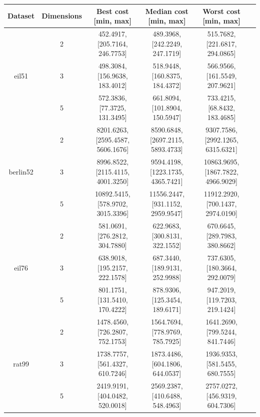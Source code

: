 \documentclass[conference]{IEEEtran}
\begin{document}
\begin{table}[h]
    \centering
    \begin{tabular}{|c|c|c|c|c|c|}
        \hline 
        Dataset & Dimensions & Best cost [min, max] & Median cost [min, max] & Worst cost [min, max] \\
        \hline
        & 2 & 452.4917, [205.7164, 246.7753] & 489.3968, [242.2249, 247.1719] & 515.7682, [221.6817, 294.0865] \\
        eil51 & 3 & 498.3084, [156.9638, 183.4012] & 518.9448, [160.8375, 184.4372] & 566.9566, [161.5549, 207.9621] \\
        & 5 & 572.3836, [77.3725, 131.3495] & 661.8094, [101.8904, 150.5947] & 733.4215, [68.8432, 183.4685] \\
        \hline
        & 2 & 8201.6263, [2595.4587, 5606.1676] & 8590.6848, [2697.2115, 5893.4733] & 9307.7586, [2992.1265, 6315.6321] \\
        berlin52 & 3 & 8996.8522, [2115.4115, 4001.3250] & 9594.4198, [1223.1735, 4365.7421] & 10863.9695, [1867.7822, 4966.9029] \\
        & 5 & 10892.5415, [578.9702, 3015.3396] & 11556.2447, [931.1152, 2959.9547] & 11912.2920, [700.1437, 2974.0190] \\
        \hline
        & 2 & 581.0691, [276.2812, 304.7880] & 622.9683, [300.8131, 322.1552] & 670.6645, [289.7983, 380.8662] \\
        eil76 & 3 & 638.9018, [195.2157, 222.1578] & 687.3440, [189.9131, 252.9988] & 737.6305, [180.3664, 292.0079] \\
        & 5 & 801.1751, [131.5410, 170.4222] & 878.9306, [125.3454, 189.6171] & 947.2019, [119.7203, 219.1424] \\
        \hline
        & 2 & 1478.4560, [726.2807, 752.1753] & 1564.7694, [778.9769, 785.7925] & 1641.2690, [799.5244, 841.7446] \\
        rat99 & 3 & 1738.7757, [561.4327, 610.7246] & 1873.4486, [604.1806, 644.0537] & 1936.9353, [581.5455, 680.7555] \\
        & 5 & 2419.9191, [404.0482, 520.0018] & 2569.2387, [410.6488, 548.4963] & 2757.0272, [456.9319, 604.7306] \\
        \hline
    \end{tabular}
     \label{Fitness results for the genetic algorithm}
\end{table}
\end{document}
